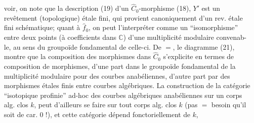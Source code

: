voir, on note que  la description (19) d'un
$\widehat C_0$-morphisme (18), $Y'$ est un revêtement (topologique)
étale fini, qui provient canoniquement
d'un rev. étale fini schématique; quant à
$\widehat f_0$, on peut l'interpréter comme un
``isomorphisme''   entre deux points (à coefficients
dans $\mathbb C$) d'une multiplicité modulaire convenab-
le, au sens du groupoïde fondamental
de celle-ci. De $=$, le diagramme (21),
montre que la composition des morphismes
dans $\widehat C_0$ s'explicite en termes de composition
de morphismes, d'une part dans le groupoïde
fondamental de la multiplicité modulaire
pour des courbes anabéliennes, d'autre part
par des morphismes étales finis entre courbes
algébriques. La construction de la catégorie
``isotopique profinie'' ad-hoc des courbes algébriques anabéliennes
sur un corps alg. clos $k$, peut d'ailleurs
se faire sur tout corps alg. clos $k$
(pas $=$ besoin qu'il soit de car. $0$ !), et
cette catégorie dépend fonctoriellement de $k$,
